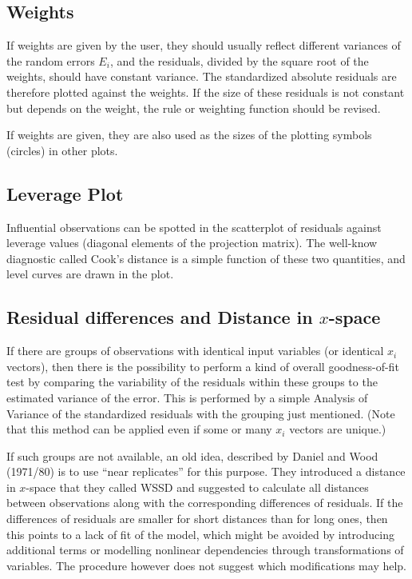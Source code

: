 \documentclass{article}
\begin{document}
\subsection{Weights}
If weights are given by the user, they should usually reflect different
variances of the random errors $E_i$, and the residuals, divided by the
square root of the weights, should have constant variance.
The standardized absolute residuals are therefore plotted against the weights.
If the size of these residuals is not constant but depends on the weight, 
the rule or weighting function should be revised.

If weights are given, they are also used as the sizes of the plotting
symbols (circles) in other plots.

\subsection{Leverage Plot}
Influential observations can be spotted in the scatterplot of residuals
against leverage values (diagonal elements of the projection matrix).
The well-know diagnostic called Cook's distance is a simple function of
these two quantities, and level curves are drawn in the plot.

\subsection{Residual differences and Distance in $x$-space}
If there are groups of observations with identical input variables
(or identical $x_i$ vectors), then there is the possibility to perform a kind
of overall goodness-of-fit test by comparing the variability of the
residuals within these groups to the estimated variance of the error.
This is performed by a simple Analysis of Variance of the standardized 
residuals with the grouping just mentioned. 
(Note that this method can be applied even if some or many $x_i$ vectors 
are unique.)

If such groups are not available, an old idea, described by
Daniel and Wood (1971/80) is to use ``near replicates'' for this purpose. 
They introduced a distance in $x$-space that they called WSSD and suggested
to calculate all distances between observations along with the
corresponding differences of residuals. If the differences of residuals
are smaller for short distances than for long ones, then this points to a
lack of fit of the model, which might be avoided by introducing 
additional terms or modelling nonlinear dependencies through
transformations of variables. The procedure however does not suggest
which modifications may help.
\end{document}
